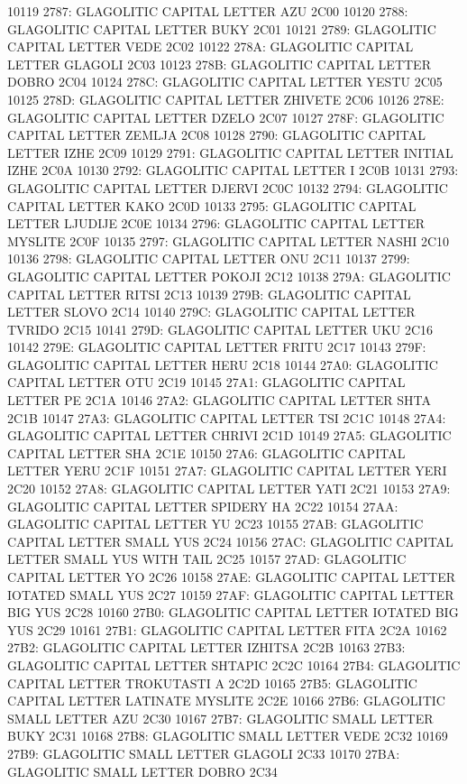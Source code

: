 10119 2787: GLAGOLITIC CAPITAL LETTER AZU 2C00
 10120 2788: GLAGOLITIC CAPITAL LETTER BUKY 2C01
 10121 2789: GLAGOLITIC CAPITAL LETTER VEDE 2C02
 10122 278A: GLAGOLITIC CAPITAL LETTER GLAGOLI 2C03
 10123 278B: GLAGOLITIC CAPITAL LETTER DOBRO 2C04
 10124 278C: GLAGOLITIC CAPITAL LETTER YESTU 2C05
 10125 278D: GLAGOLITIC CAPITAL LETTER ZHIVETE 2C06
 10126 278E: GLAGOLITIC CAPITAL LETTER DZELO 2C07
 10127 278F: GLAGOLITIC CAPITAL LETTER ZEMLJA 2C08
 10128 2790: GLAGOLITIC CAPITAL LETTER IZHE 2C09
 10129 2791: GLAGOLITIC CAPITAL LETTER INITIAL IZHE 2C0A
 10130 2792: GLAGOLITIC CAPITAL LETTER I 2C0B
 10131 2793: GLAGOLITIC CAPITAL LETTER DJERVI 2C0C
 10132 2794: GLAGOLITIC CAPITAL LETTER KAKO 2C0D
 10133 2795: GLAGOLITIC CAPITAL LETTER LJUDIJE 2C0E
 10134 2796: GLAGOLITIC CAPITAL LETTER MYSLITE 2C0F
 10135 2797: GLAGOLITIC CAPITAL LETTER NASHI 2C10
 10136 2798: GLAGOLITIC CAPITAL LETTER ONU 2C11
 10137 2799: GLAGOLITIC CAPITAL LETTER POKOJI 2C12
 10138 279A: GLAGOLITIC CAPITAL LETTER RITSI 2C13
 10139 279B: GLAGOLITIC CAPITAL LETTER SLOVO 2C14
 10140 279C: GLAGOLITIC CAPITAL LETTER TVRIDO 2C15
 10141 279D: GLAGOLITIC CAPITAL LETTER UKU 2C16
 10142 279E: GLAGOLITIC CAPITAL LETTER FRITU 2C17
 10143 279F: GLAGOLITIC CAPITAL LETTER HERU 2C18
 10144 27A0: GLAGOLITIC CAPITAL LETTER OTU 2C19
 10145 27A1: GLAGOLITIC CAPITAL LETTER PE 2C1A
 10146 27A2: GLAGOLITIC CAPITAL LETTER SHTA 2C1B
 10147 27A3: GLAGOLITIC CAPITAL LETTER TSI 2C1C
 10148 27A4: GLAGOLITIC CAPITAL LETTER CHRIVI 2C1D
 10149 27A5: GLAGOLITIC CAPITAL LETTER SHA 2C1E
 10150 27A6: GLAGOLITIC CAPITAL LETTER YERU 2C1F
 10151 27A7: GLAGOLITIC CAPITAL LETTER YERI 2C20
 10152 27A8: GLAGOLITIC CAPITAL LETTER YATI 2C21
 10153 27A9: GLAGOLITIC CAPITAL LETTER SPIDERY HA 2C22
 10154 27AA: GLAGOLITIC CAPITAL LETTER YU 2C23
 10155 27AB: GLAGOLITIC CAPITAL LETTER SMALL YUS 2C24
 10156 27AC: GLAGOLITIC CAPITAL LETTER SMALL YUS WITH TAIL 2C25
 10157 27AD: GLAGOLITIC CAPITAL LETTER YO 2C26
 10158 27AE: GLAGOLITIC CAPITAL LETTER IOTATED SMALL YUS 2C27
 10159 27AF: GLAGOLITIC CAPITAL LETTER BIG YUS 2C28
 10160 27B0: GLAGOLITIC CAPITAL LETTER IOTATED BIG YUS 2C29
 10161 27B1: GLAGOLITIC CAPITAL LETTER FITA 2C2A
 10162 27B2: GLAGOLITIC CAPITAL LETTER IZHITSA 2C2B
 10163 27B3: GLAGOLITIC CAPITAL LETTER SHTAPIC 2C2C
 10164 27B4: GLAGOLITIC CAPITAL LETTER TROKUTASTI A 2C2D
 10165 27B5: GLAGOLITIC CAPITAL LETTER LATINATE MYSLITE 2C2E
 10166 27B6: GLAGOLITIC SMALL LETTER AZU 2C30
 10167 27B7: GLAGOLITIC SMALL LETTER BUKY 2C31
 10168 27B8: GLAGOLITIC SMALL LETTER VEDE 2C32
 10169 27B9: GLAGOLITIC SMALL LETTER GLAGOLI 2C33
 10170 27BA: GLAGOLITIC SMALL LETTER DOBRO 2C34

